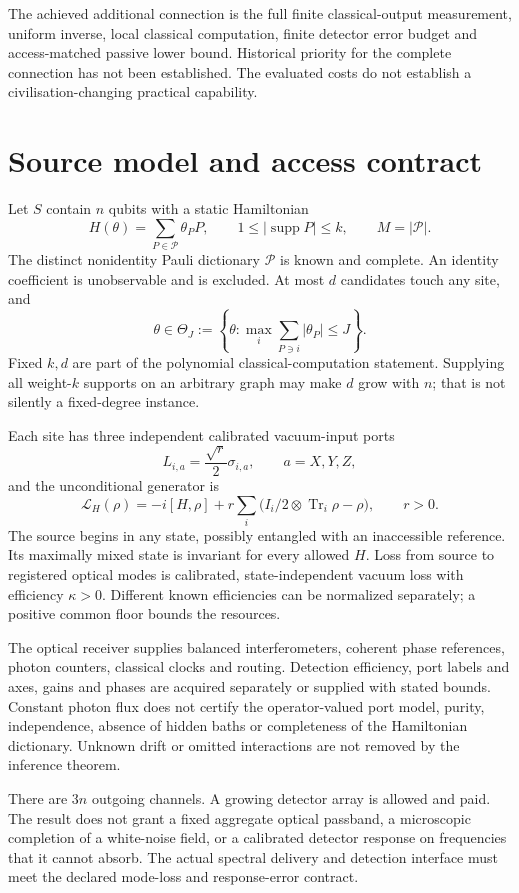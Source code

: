 \documentclass[11pt]{article}
\newcommand{\Tr}{\operatorname{Tr}}
\newcommand{\supp}{\operatorname{supp}}
\newcommand{\cL}{\mathcal L}
\newcommand{\cP}{\mathcal P}
\begin{document}
The achieved additional connection is the full finite classical-output measurement, uniform inverse, local classical computation, finite detector error budget and access-matched passive lower bound. Historical priority for the complete connection has not been established. The evaluated costs do not establish a civilisation-changing practical capability.

\section{Source model and access contract}
Let \(S\) contain \(n\) qubits with a static Hamiltonian
\[
 H(\theta)=\sum_{P\in\cP}\theta_P P,\qquad
 1\le |\supp P|\le k,\qquad M=|\cP|.
\]
The distinct nonidentity Pauli dictionary \(\cP\) is known and complete. An identity coefficient is unobservable and is excluded. At most \(d\) candidates touch any site, and
\[
 \theta\in\Theta_J:=\left\{\theta:
 \max_i\sum_{P\ni i}|\theta_P|\le J\right\}.
\]
Fixed \(k,d\) are part of the polynomial classical-computation statement. Supplying all weight-\(k\) supports on an arbitrary graph may make \(d\) grow with \(n\); that is not silently a fixed-degree instance.

Each site has three independent calibrated vacuum-input ports
\[
 L_{i,a}=\frac{\sqrt r}{2}\sigma_{i,a},\qquad a=X,Y,Z,
\]
and the unconditional generator is
\[
 \cL_H(\rho)=-i[H,\rho]
 +r\sum_i\bigl(I_i/2\otimes\Tr_i\rho-\rho\bigr),\qquad r>0.
\]
The source begins in any state, possibly entangled with an inaccessible reference. Its maximally mixed state is invariant for every allowed \(H\). Loss from source to registered optical modes is calibrated, state-independent vacuum loss with efficiency \(\kappa>0\). Different known efficiencies can be normalized separately; a positive common floor bounds the resources.

The optical receiver supplies balanced interferometers, coherent phase references, photon counters, classical clocks and routing. Detection efficiency, port labels and axes, gains and phases are acquired separately or supplied with stated bounds. Constant photon flux does not certify the operator-valued port model, purity, independence, absence of hidden baths or completeness of the Hamiltonian dictionary. Unknown drift or omitted interactions are not removed by the inference theorem.

There are \(3n\) outgoing channels. A growing detector array is allowed and paid. The result does not grant a fixed aggregate optical passband, a microscopic completion of a white-noise field, or a calibrated detector response on frequencies that it cannot absorb. The actual spectral delivery and detection interface must meet the declared mode-loss and response-error contract.
\end{document}
